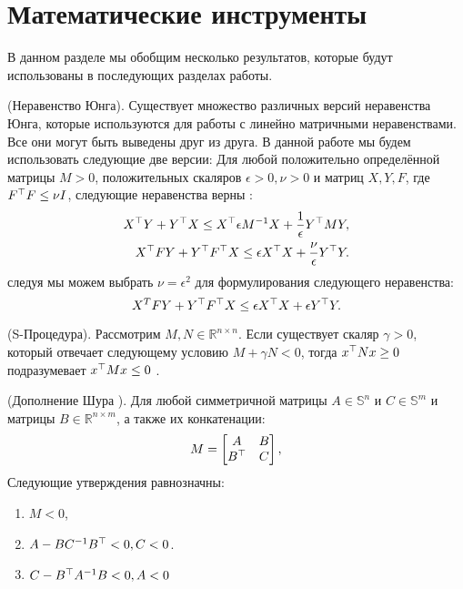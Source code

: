 \section{Математические инструменты}\label{sec:ch3/sect1}
В данном разделе мы обобщим несколько результатов, которые будут использованы в последующих разделах работы.
\begin{lemma}\label{lemma:Young}
	(Неравенство Юнга).
	Существует множество различных версий неравенства Юнга, которые используются для работы с линейно матричными неравенствами. Все они могут быть выведены друг из друга. В данной работе мы будем использовать следующие две версии:
	Для любой положительно определённой матрицы $M>0$, положительных скаляров $\epsilon > 0, \nu > 0$ и матриц ${X}, {Y}, {F}$, где ${F}^\top{F}\leq \nu{I}$, следующие неравенства верны \cite{BOYED1994}:
	\begin{align}
		\label{eq:Young_relation_BMI}
		{X}^\top{Y} + {Y}^\top{X}  \leq {X}^\top 
		\epsilon {M}^{-1}{X} + \frac{1}{\epsilon}   {Y}^\top  {M}{Y}, 
		\\
		\label{eq:Young_robust_2}
		{X}^\top{F}{Y} + {Y}^\top{F}^\top{X}  \leq \epsilon {X}^\top{X} +  \frac{\nu}{\epsilon} {Y}^\top {Y}.
	\end{align}
	следуя \cite{LIEN2008} мы можем выбрать $\nu=\epsilon^2$ для формулирования следующего неравенства:
	\begin{equation}
		\label{eq:updated_Young_robust_2}
		{X}^T{F}{Y} + {Y}^\top{F}^\top{X}  \leq \epsilon {X}^\top{X} + \epsilon {Y}^\top{Y}.
	\end{equation}
\end{lemma}

\begin{lemma}\label{lemma:S_procedure}
	(S-Процедура).
	Рассмотрим ${M},{N} \in \mathbb{R}^{n\times n}$. Если существует скаляр $\gamma>0$, который отвечает следующему условию ${M}+\gamma {N}<0$, тогда $x^\top {N} x\geq 0$ подразумевает $x^\top{M}x\leq 0$ \cite{BOYED1994}.
\end{lemma}

\begin{lemma}\label{lemma:Schur}
	(Дополнение Шура \cite{Schur}).
	Для любой симметричной матрицы ${A}\in \mathbb{S}^n$ и ${C}\in \mathbb{S}^m$ и матрицы ${B}\in \mathbb{R}^{n\times m}$, а также их конкатенации:
	\noindent \begin{align*}
		{M}= \begin{bmatrix}
			{A} & {B} \\
			{B}^\top & {C} 
		\end{bmatrix},
	\end{align*}
	Следующие утверждения равнозначны:
	\noindent
	\begin{enumerate}
		\item ${M} < 0$,
		\item ${A}-{B}{C}^{-1}{B}^\top < 0 , {C}< 0$.
		\item ${C}-{B}^\top{A}^{-1}{B}< 0 , {A}< 0$
	\end{enumerate}
\end{lemma}


